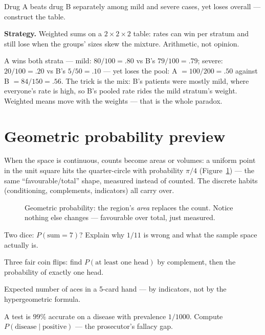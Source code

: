 \begin{example}\label{ex:simpson}
Drug A beats drug B separately among mild and severe cases, yet loses
overall --- construct the table.
\par\smallskip
\textbf{Strategy.} Weighted sums on a $2\times2\times2$ table: rates
can win per stratum and still lose when the groups' sizes skew the
mixture. Arithmetic, not opinion.
\par\smallskip
\begin{solution}
A wins both strata --- mild: $80/100 = .80$ vs B's $79/100 = .79$;
severe: $20/100 = .20$ vs B's $5/50 = .10$ --- yet loses the pool:
A $= 100/200 = .50$ against B $= 84/150 = .56$. The trick is the mix:
B's patients were mostly mild, where everyone's rate is high, so B's
pooled rate rides the mild stratum's weight. Weighted means move with
the weights --- that is the whole paradox.
\end{solution}
\end{example}

\section{Geometric probability preview}\label{sec:geo}
When the space is continuous, counts become areas or volumes:
a uniform point in the unit square hits the quarter-circle
with probability $\pi/4$ (Figure~\ref{fig:geo}) --- the same
``favourable/total'' shape, measured instead of counted. The discrete
habits (conditioning, complements, indicators) all carry over.

\begin{figure}[ht]\centering

\caption{Geometric probability: the region's \emph{area} replaces the
count. Notice nothing else changes --- favourable over total, just
measured.}
\label{fig:geo}
\end{figure}

\begin{exercise}[easy]\label{exr:p1}
Two dice: $P(\text{sum} = 7)$? Explain why $1/11$ is wrong and what
the sample space actually is.
\end{exercise}
\begin{exercise}[medium]\label{exr:p2}
Three fair coin flips: find $P(\text{at least one head})$ by
complement, then the probability of exactly one head.
\end{exercise}
\begin{exercise}[medium]\label{exr:p3}
Expected number of aces in a 5-card hand --- by indicators, not by the
hypergeometric formula.
\end{exercise}
\begin{exercise}[medium]\label{exr:p4}
A test is $99\%$ accurate on a disease with prevalence $1/1000$.
Compute $P(\text{disease} \mid \text{positive})$ --- the prosecutor's
fallacy gap.
\end{exercise}

